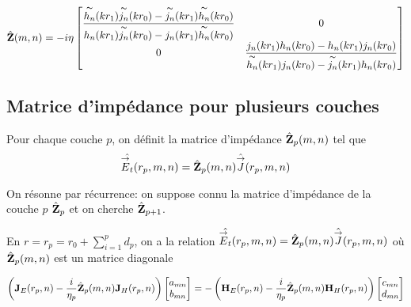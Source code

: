         \begin{equation}
            \hat{\mZ}(m,n) = -i\eta
            \begin{bmatrix}
                \frac
                {\tilde{h_n}(kr_1)\tilde{j_n}(kr_0)-\tilde{j_n}(kr_1)\tilde{h_n}(kr_0)}
                {{h_n}(kr_1)\tilde{j_n}(kr_0)-{j_n}(kr_1)\tilde{h_n}(kr_0)} & 0
                \\
                0 & \frac
                {{j_n}(kr_1){h_n}(kr_0)-{h_n}(kr_1){j_n}(kr_0)}
                {\tilde{h_n}(kr_1){j_n}(kr_0)-\tilde{j_n}(kr_1){h_n}(kr_0)}
            \end{bmatrix}
        \end{equation}

    \subsection{Matrice d'impédance pour plusieurs couches}
    
        \begin{figure}[!hbt]
          \centering
          \begin{tikzpicture}
            
          \end{tikzpicture}
        \end{figure}


        \begin{defn}
          Pour chaque couche \(p\), on définit la matrice d'impédance \(\hat{\mZ}_p(m,n)\) tel que
          \[
              \hat{\vE_t}(r_p,m,n) = \hat{\mZ}_p(m,n)\hat{\vJ}(r_p,m,n)
          \]
        \end{defn}

        On résonne par récurrence: on suppose connu la matrice d'impédance de la couche \(p\) \(\hat{\mZ}_p\) et on cherche \(\hat{\mZ}_{p+1}\).

        En \(r=r_{p}=r_0+\sum_{i=1}^p d_p\), on a la relation \( \hat{\vE_t}(r_p,m,n) = \hat{\mZ}_p(m,n)\hat{\vJ}(r_p,m,n)\) où \(\hat{\mZ}_p(m,n)\) est un matrice diagonale

        \begin{equation}
            \left(\mJ_{E}(r_p,n) - \frac{i}{\eta_p}\hat{\mZ}_p(m,n)\mJ_{H}(r_p,n) \right)
            \begin{bmatrix}
                a_{mn}
                \\
                b_{mn}
            \end{bmatrix}
            = -
            \left(\mH_{E}(r_p,n) - \frac{i}{\eta_p}\hat{\mZ}_p(m,n)\mH_{H}(r_p,n) \right)
            \begin{bmatrix}
                c_{mn}
                \\
                d_{mn}
            \end{bmatrix}
        \end{equation}

